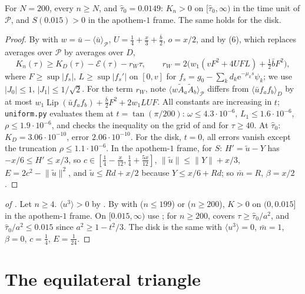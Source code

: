 \documentclass[11pt,a4paper]{report}
\DeclareRobustCommand*{\avg}[1]{\langle #1\rangle}
\DeclareRobustCommand*{\norm}[1]{\lVert #1\rVert}
\DeclareRobustCommand*{\ut}{\tilde u}
\begin{document}
\begin{proposition}\label{prop:large}
For \(N=200\), every \(n\ge N\), and \(\hat\tau_0=0.0149\): \(K_n>0\) on \([\hat\tau_0,\infty)\) in the time unit of \(\mathcal P\), and \(S(0.015)>0\) in the apothem-\(1\) frame. The same holds for the disk.
\end{proposition}
\begin{proof}
By  with \(w=\bar u-\avg{\bar u}_{\mathcal P}\), \(U=\frac14+\frac x3+\frac{\bar b}2\), \(o=x/2\), and by (6), which replaces averages over \(\mathcal P\) by averages over \(D\),
\[
K_n(\tau)\ge K_D(\tau)-\mathcal E(\tau)-r_W\tau,\qquad r_W=2\bigl(w_1(vF^2+4UFL)+\tfrac12\bar bF^2\bigr),
\]
where \(F\ge\sup|f_s|\), \(L\ge\sup|f_s'|\) on \([0,v]\) for \(f_s=g_0-\sum_kd_k\mathrm e^{-\mu_ks}\psi_k\); we use \(|J_0|\le1\), \(|J_1|\le1/\sqrt2\). For the term \(r_W\), note
\(\avg{w\tilde A_a\tilde A_b}_{\mathcal P}\) differs from \(\avg{\bar uf_af_b}_D\) by at most \(w_1\operatorname{Lip}(\bar uf_af_b)+\frac{\bar b}2F^2+2w_1LUF\).
All constants are increasing in \(t\); \texttt{uniform.py} evaluates them at \(t=\tan(\pi/200)\): \(\omega\le4.3\cdot10^{-6}\), \(L_1\le1.6\cdot10^{-6}\), \(\rho\le1.9\cdot10^{-6}\), and checks the
inequality on the grid of  and for \(\tau\ge40\). At \(\hat\tau_0\): \(K_D=3.06\cdot10^{-10}\), error \(2.06\cdot10^{-10}\). For the disk, \(t=0\), all errors vanish except the truncation \(\rho\le1.1\cdot10^{-6}\).
In the apothem-\(1\) frame, for \(S\): \(H'=\ut-Y\) has \(-x/6\le H'\le x/3\), so \(c\in[\frac14-\frac x{12},\frac14+\frac{5x}{12}]\), \(\norm{\ut}\le\norm Y+x/3\), \(E=2c^2-\norm{\ut}^2\), and \(\ut\le Rd+x/2\) because \(Y\le x/6+Rd\); so
\(\bar m=R\), \(\beta=x/2\).
\end{proof}

\begin{proof}[of ]
Let \(n\ge4\). \(\avg{u^3}>0\) by . By  with  (\(n\le199\)) or  (\(n\ge200\)), \(K>0\) on \((0,0.015]\) in the apothem-\(1\) frame. On
\([0.015,\infty)\) use ; for \(n\ge200\),  covers \(\tau\ge\hat\tau_0/a^2\), and \(\hat\tau_0/a^2\le0.015\) since \(a^2\ge1-t^2/3\). The disk is the same with \(\avg{u^3}=0\), \(\bar m=1\), \(\beta=0\), \(c=\frac14\), \(E=\frac1{24}\).
\end{proof}

\section{The equilateral triangle}\label{sec:triangle}
\end{document}
